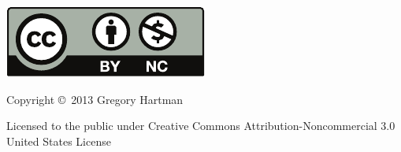 \noindent\hskip -1in\begin{minipage}{2in}
\includegraphics{text/by-nc} 
\end{minipage}
\begin{minipage}{3in}
\noindent Copyright \copyright\ 2013 Gregory Hartman

Licensed to the public under Creative Commons Attribution-Noncommercial 3.0 United States License
\end{minipage}

